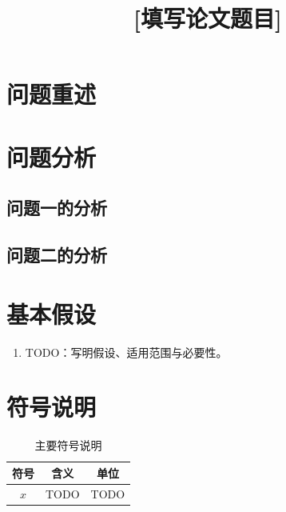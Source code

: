 \documentclass[withoutpreface,bwprint]{cumcmthesis}
\title{[填写论文题目]}
\begin{document}
\maketitle

\begin{abstract}

\keywords{[关键词一]\quad [关键词二]\quad [关键词三]\quad [关键词四]}
\end{abstract}


\section{问题重述}

\section{问题分析}

\subsection{问题一的分析}

\subsection{问题二的分析}


\section{基本假设}
\begin{enumerate}
  \item TODO：写明假设、适用范围与必要性。
\end{enumerate}

\section{符号说明}
\begin{table}[H]
  \centering
  \caption{主要符号说明}
  \label{tab:symbols}
  \begin{tabular}{ccc}
    \toprule
    符号 & 含义 & 单位 \\
    \midrule
    $x$ & TODO & TODO \\
    \bottomrule
  \end{tabular}
\end{table}
\end{document}
